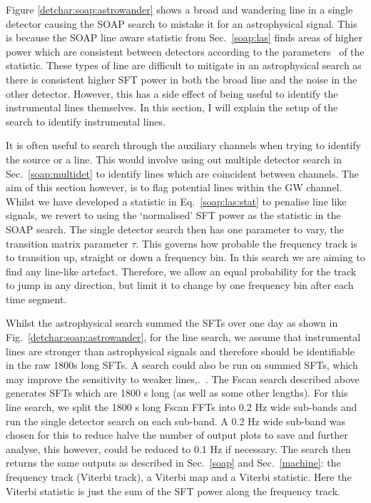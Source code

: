 %
Figure \ref{detchar:soap:astrowander} shows a broad and wandering line in a single
detector causing the SOAP search to mistake it for an astrophysical signal.
This is because the SOAP line aware statistic from Sec.~\ref{soap:las} finds
areas of higher power which are consistent between detectors according to the
parameters~ of the
statistic. These types of line are difficult to mitigate in an astrophysical
search as there is consistent higher \gls{SFT} power in both the broad line and the noise in the other detector.
However, this has a side effect of being useful to identify the
instrumental lines themselves.
In this section, I will explain the setup of the search to identify
instrumental lines.

It is often useful to search through the auxiliary channels when trying to
identify the source or a line. 
This would involve using out multiple detector search in Sec.~\ref{soap:multidet} to identify lines which are coincident between channels. 
The aim of this section however, is to flag potential lines within the \gls{GW} channel.
Whilst we have developed a statistic in Eq.~\ref{soap:las:stat} to penalise line like signals, we revert to using the
`normalised' \gls{SFT} power as the statistic in the SOAP search. The single
detector search then has one parameter to vary, the transition matrix
parameter $\tau$.  This governs how probable the frequency track is to transition up,
straight or down a frequency bin.  In this search we are aiming to find any line-like artefact.
Therefore, we allow an equal probability for the track to jump in any
direction, but limit it to change by one frequency bin after each time
segment.  

Whilst the astrophysical search summed the \glspl{SFT} over one day
as shown in Fig.~\ref{detchar:soap:astrowander}, for the line search, we assume
that instrumental lines are stronger than astrophysical signals and therefore
should be identifiable in the raw 1800s long \glspl{SFT}.
A search could also be run on summed \glspl{SFT}, which may improve the sensitivity to weaker lines,.~. The Fscan search
described above generates \glspl{SFT} which are 1800 s long (as well as some other lengths).  For this line search, we split the 1800 s
long Fscan \glspl{FFT} into 0.2 Hz wide sub-bands and run the single detector
search on each sub-band. A 0.2 Hz wide sub-band was chosen for this to reduce halve the number of output plots to save and further analyse, this however, could be reduced to 0.1 Hz if necessary.  The search then returns the same outputs as described in
Sec.~\ref{soap} and Sec.~\ref{machine}: the frequency track (Viterbi track), a
Viterbi map and a Viterbi statistic.  Here the Viterbi statistic is just the
sum of the \gls{SFT} power along the frequency track.  

